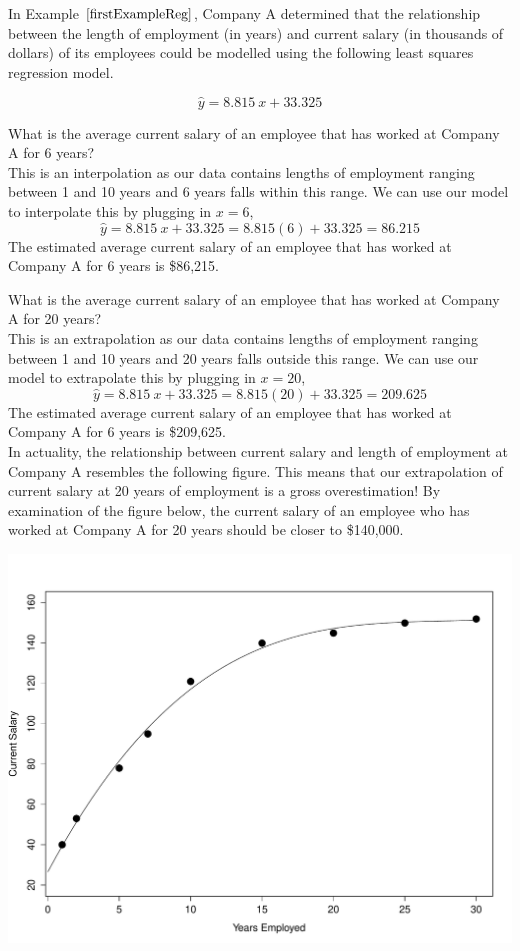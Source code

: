 \begin{example}
In Example $\ref{firstExampleReg}$, Company A determined that the relationship between the length of employment (in years) and current salary (in thousands of dollars) of its employees could be modelled using the following least squares regression model.

\[ \hat{y} = 8.815~x + 33.325 \]

\begin{benumerate}
\item What is the average current salary of an employee that has worked at Company A for 6 years? \\

This is an interpolation as our data contains lengths of employment ranging between 1 and 10 years and 6 years falls within this range. We can use our model to interpolate this by plugging in $x=6$,
\[ \hat{y} = 8.815~x + 33.325 = 8.815(6) + 33.325 = 86.215\]
The estimated average current salary of an employee that has worked at Company A for 6 years is \$86,215.

\item What is the average current salary of an employee that has worked at Company A for 20 years? \\

This is an extrapolation as our data contains lengths of employment ranging between 1 and 10 years and 20 years falls outside this range.
We can use our model to extrapolate this by plugging in $x=20$,
\[ \hat{y} = 8.815~x + 33.325 = 8.815(20) + 33.325 = 209.625\]
The estimated average current salary of an employee that has worked at Company A for 6 years is \$209,625. \\

In actuality, the relationship between current salary and length of employment at Company A resembles the following figure. This means that our extrapolation of current salary at 20 years of employment is a gross overestimation! By examination of the figure below, the current salary of an employee who has worked at Company A for 20 years should be closer to \$140,000.

\begin{center}
\includegraphics[scale=0.5]{Section8/truefit.pdf}
\end{center}


\end{benumerate}
\end{example}
